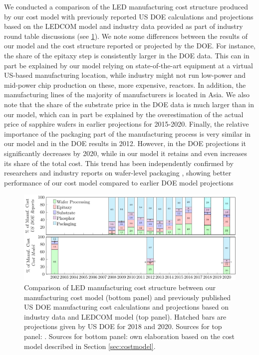 \documentclass[10pt]{article}
\begin{document}
We conducted a comparison of the LED manufacturing cost structure produced by our cost model with previously reported US DOE calculations and projections based on the LEDCOM model and industry data provided as part of industry round table discussions (see \cref{fig:costmodel_calibration}). We note some differences between the results of our model and the cost structure reported or projected by the DOE. For instance, the share of the epitaxy step is consistently larger in the DOE data. This can in part be explained by our model relying on state-of-the-art equipment at a virtual US-based manufacturing location, while industry might not run low-power and mid-power chip production on these, more expensive, reactors. In addition, the manufacturing lines of the majority of manufacturers is located in Asia. We also note that the share of the substrate price in the DOE data is much larger than in our model, which can in part be explained by the overestimation of the actual price of sapphire wafers in earlier projections for 2015-2020. Finally, the relative importance of the packaging part of the manufacturing process is very similar in our model and in the DOE results in 2012. However, in the DOE projections it significantly decreases by 2020, while in our model it retains and even increases its share of the total cost. This trend has been independently confirmed by researchers and industry reports on wafer-level packaging \cite{Lee2011WPL}\cite{Xie2013}\cite{ledsmag2017WLP}, showing better performance of our cost model compared to earlier DOE model projections

\begin{figure}[h]
	\centering
    \includegraphics[width=\textwidth]{2_SSL_EST/article/figures/costmodel_calibration.pdf}
	\caption{Comparison of LED manufacturing cost structure between our manufacturing cost model (bottom panel) and previously published US DOE manufacturing cost calculations and projections based on industry data and LEDCOM model (top panel). Hatched bars are projections given by US DOE for 2018 and 2020. Sources for top panel: \cite{doe2010solid}\cite{doe2011solid}\cite{doe2012solid}\cite{doe2013solid}\cite{doe2014solid}\cite{doe2015solid}\cite{doe2016solid}. Sources for bottom panel: own elaboration based on the cost model described in Section \cref{sec:costmodel}.}
	\label{fig:costmodel_calibration}
\end{figure}
\end{document}

